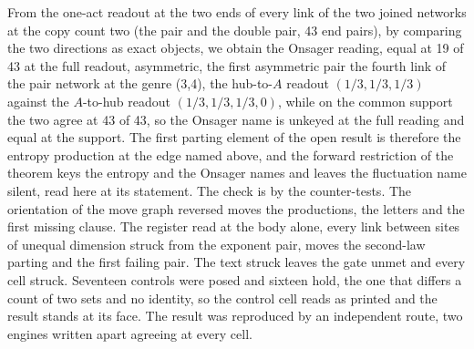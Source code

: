 \begin{chproof}[census]
From the one-act readout at the two ends of every link of the two joined networks at the copy count two (the pair and the double pair, 43 end pairs), by comparing the two directions as exact objects, we obtain the Onsager reading, equal at 19 of 43 at the full readout, asymmetric, the first asymmetric pair the fourth link of the pair network at the genre (3,4), the hub-to-$A$ readout $(1/3, 1/3, 1/3)$ against the $A$-to-hub readout $(1/3, 1/3, 1/3, 0)$, while on the common support the two agree at 43 of 43, so the Onsager name is unkeyed at the full reading and equal at the support. The first parting element of the open result is therefore the entropy production at the edge named above, and the forward restriction of the theorem keys the entropy and the Onsager names and leaves the fluctuation name silent, read here at its statement.
The check is by the counter-tests. The orientation of the move graph reversed moves the productions, the letters and the first missing clause. The register read at the body alone, every link between sites of unequal dimension struck from the exponent pair, moves the second-law parting and the first failing pair. The text struck leaves the gate unmet and every cell struck. Seventeen controls were posed and sixteen hold, the one that differs a count of two sets and no identity, so the control cell reads as printed and the result stands at its face.
The result was reproduced by an independent route, two engines written apart agreeing at every cell.
\end{chproof}

\par\medskip{}\label{narr:close:11-7}\par
